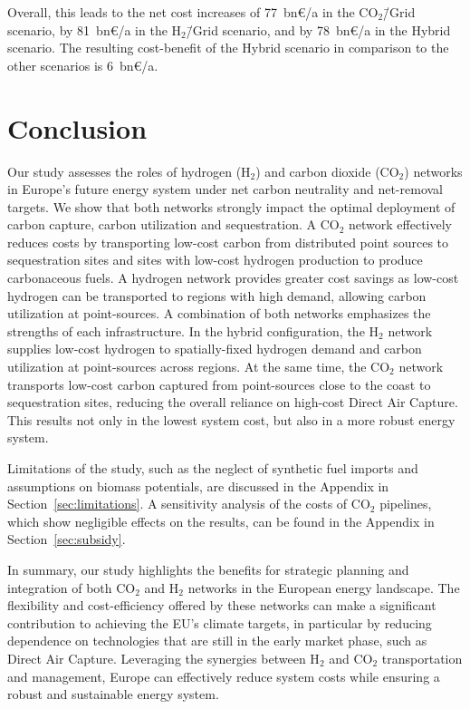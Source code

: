 \documentclass[twocolumn]{article}
\newcommand{\carbon}{CO$_2$}
\newcommand{\hydrogen}{H$_2$}
\newcommand{\carbonscenario}{CO$_2$\=/Grid scenario}
\newcommand{\hydrogenscenario}{H$_2$\=/Grid scenario}
\newcommand{\hybridscenario}{Hybrid scenario}
\begin{document}
Overall, this leads to the net cost increases of 77~bn€/a in the \carbonscenario{}, by 81~bn€/a in the \hydrogenscenario{}, and by 78~bn€/a in the \hybridscenario{}. The resulting cost-benefit of the \hybridscenario{} in comparison to the other scenarios is 6~bn€/a.


\section{Conclusion}
\label{sec:conclusion}


Our study assesses the roles of hydrogen (\hydrogen{}) and carbon dioxide (\carbon{}) networks in Europe's future energy system under net carbon neutrality and net-removal targets. We show that both networks strongly impact the optimal deployment of carbon capture, carbon utilization and sequestration. A \carbon{} network effectively reduces costs by transporting low-cost carbon from distributed point sources to sequestration sites and sites with low-cost hydrogen production to produce carbonaceous fuels. A hydrogen network provides greater cost savings as low-cost hydrogen can be transported to regions with high demand, allowing carbon utilization at point-sources. A combination of both networks emphasizes the strengths of each infrastructure. In the hybrid configuration, the \hydrogen{} network supplies low-cost hydrogen to spatially-fixed hydrogen demand and carbon utilization at point-sources across regions. At the same time, the \carbon{} network transports low-cost carbon captured from point-sources close to the coast to sequestration sites, reducing the overall reliance on high-cost Direct Air Capture. This results not only in the lowest system cost, but also in a more robust energy system.


Limitations of the study, such as the neglect of synthetic fuel imports and assumptions on biomass potentials, are discussed in the Appendix in Section~\ref{sec:limitations}. A sensitivity analysis of the costs of \carbon{} pipelines, which show negligible effects on the results, can be found in the Appendix in Section~\ref{sec:subsidy}.

In summary, our study highlights the benefits for strategic planning and integration of both \carbon{} and \hydrogen{} networks in the European energy landscape. The flexibility and cost-efficiency offered by these networks can make a significant contribution to achieving the EU's climate targets, in particular by reducing dependence on technologies that are still in the early market phase, such as Direct Air Capture. Leveraging the synergies between \hydrogen{} and \carbon{} transportation and management, Europe can effectively reduce system costs while ensuring a robust and sustainable energy system.
\end{document}
